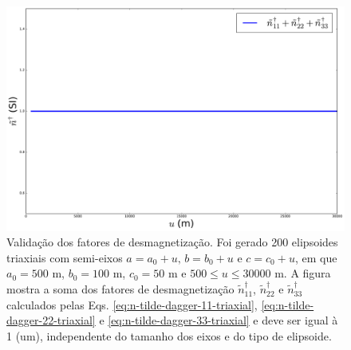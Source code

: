 \begin{figure}[hbt!]
	\centering \includegraphics[width=15 cm,height=10 cm]{figures/test_n_soma}
	\caption[Validação dos fatores de desmagnetização. Foi gerado 200 elipsoides triaxiais com semi-eixos $a = a_0 +u, \, b = b_0+u$ e $c = c_0+u$, em que $a_0=500$ m, $b_0=100$ m, $c_0=50$ m e $500  \le u \le 30000$ m. A figura mostra a soma dos fatores de desmagnetização $\tilde{n}^{\dagger}_{11}$, $\tilde{n}^{\dagger}_{22}$ e $\tilde{n}^{\dagger}_{33}$ calculados pelas Eqs. \ref{eq:n-tilde-dagger-11-triaxial}, \ref{eq:n-tilde-dagger-22-triaxial} e \ref{eq:n-tilde-dagger-33-triaxial} e deve ser igual à 1 (um), independente do tamanho dos eixos e do tipo de elipsoide.]{Validação dos fatores de desmagnetização. Foi gerado 200 elipsoides triaxiais com semi-eixos $a = a_0 +u, \, b = b_0+u$ e $c = c_0+u$, em que $a_0=500$ m, $b_0=100$ m, $c_0=50$ m e $500  \le u \le 30000$ m. A figura mostra a soma dos fatores de desmagnetização $\tilde{n}^{\dagger}_{11}$, $\tilde{n}^{\dagger}_{22}$ e $\tilde{n}^{\dagger}_{33}$ calculados pelas Eqs. \ref{eq:n-tilde-dagger-11-triaxial}, \ref{eq:n-tilde-dagger-22-triaxial} e \ref{eq:n-tilde-dagger-33-triaxial} e deve ser igual à 1 (um), independente do tamanho dos eixos e do tipo de elipsoide.}
	\label{fig:teste_n_soma}
\end{figure}
